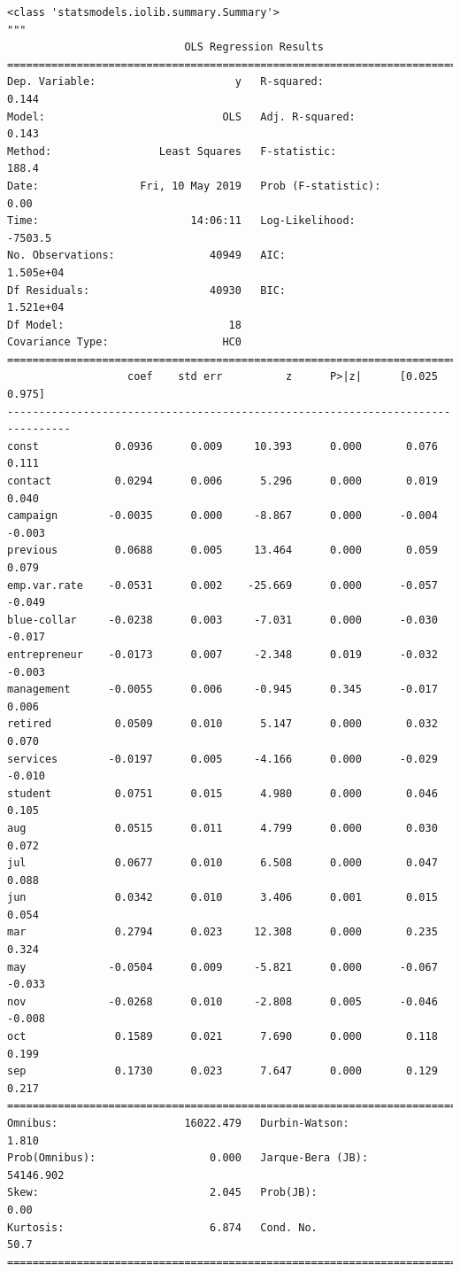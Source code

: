 \documentclass[8pt,onecolumn,aps,pra]{revtex4-1}
\begin{document}
    
    \begin{verbatim}
<class 'statsmodels.iolib.summary.Summary'>
"""
                            OLS Regression Results                            
==============================================================================
Dep. Variable:                      y   R-squared:                       0.144
Model:                            OLS   Adj. R-squared:                  0.143
Method:                 Least Squares   F-statistic:                     188.4
Date:                Fri, 10 May 2019   Prob (F-statistic):               0.00
Time:                        14:06:11   Log-Likelihood:                -7503.5
No. Observations:               40949   AIC:                         1.505e+04
Df Residuals:                   40930   BIC:                         1.521e+04
Df Model:                          18                                         
Covariance Type:                  HC0                                         
================================================================================
                   coef    std err          z      P>|z|      [0.025      0.975]
--------------------------------------------------------------------------------
const            0.0936      0.009     10.393      0.000       0.076       0.111
contact          0.0294      0.006      5.296      0.000       0.019       0.040
campaign        -0.0035      0.000     -8.867      0.000      -0.004      -0.003
previous         0.0688      0.005     13.464      0.000       0.059       0.079
emp.var.rate    -0.0531      0.002    -25.669      0.000      -0.057      -0.049
blue-collar     -0.0238      0.003     -7.031      0.000      -0.030      -0.017
entrepreneur    -0.0173      0.007     -2.348      0.019      -0.032      -0.003
management      -0.0055      0.006     -0.945      0.345      -0.017       0.006
retired          0.0509      0.010      5.147      0.000       0.032       0.070
services        -0.0197      0.005     -4.166      0.000      -0.029      -0.010
student          0.0751      0.015      4.980      0.000       0.046       0.105
aug              0.0515      0.011      4.799      0.000       0.030       0.072
jul              0.0677      0.010      6.508      0.000       0.047       0.088
jun              0.0342      0.010      3.406      0.001       0.015       0.054
mar              0.2794      0.023     12.308      0.000       0.235       0.324
may             -0.0504      0.009     -5.821      0.000      -0.067      -0.033
nov             -0.0268      0.010     -2.808      0.005      -0.046      -0.008
oct              0.1589      0.021      7.690      0.000       0.118       0.199
sep              0.1730      0.023      7.647      0.000       0.129       0.217
==============================================================================
Omnibus:                    16022.479   Durbin-Watson:                   1.810
Prob(Omnibus):                  0.000   Jarque-Bera (JB):            54146.902
Skew:                           2.045   Prob(JB):                         0.00
Kurtosis:                       6.874   Cond. No.                         50.7
==============================================================================


\end{verbatim}
\end{document}
